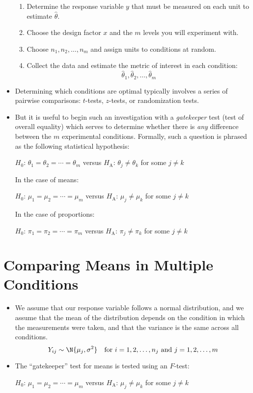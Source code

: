 \begin{itemize}
\begin{enumerate}
                  \item Determine the response variable $ y $ that must be measured on each
                        unit to estimate $ \hat{\theta} $.
                  \item Choose the design factor $ x $ and the $ m $ levels you will experiment with.
                  \item Choose $ n_1,n_2,\ldots,n_m $ and assign units to conditions at random.
                  \item Collect the data and estimate the metric of interest in each condition:
                        \[ \hat{\theta}_1,\hat{\theta}_2,\ldots,\hat{\theta}_m \]
            \end{enumerate}
      \item Determining which conditions are optimal typically involves a series of pairwise
            comparisons: $ t $-tests, $ z $-tests, or randomization tests.
      \item But it is useful to begin such an investigation with a \emph{gatekeeper}
            test (test of overall equality) which serves to determine whether
            there is \emph{any} difference between the $ m $ experimental conditions.
            Formally, such a question is phrased as the following statistical hypothesis:

            \centerline{$ H_0 $: $ \theta_1=\theta_2=\cdots=\theta_m $ versus $ H_\text{A} $: $ \theta_j\ne \theta_k $ for some $ j\ne k $}

            In the case of means:

            \centerline{$ H_0 $: $ \mu_1=\mu_2=\cdots=\mu_m $ versus $ H_\text{A} $: $ \mu_j\ne \mu_k $ for some $ j\ne k $}

            In the case of proportions:

            \centerline{$ H_0 $: $ \pi_1=\pi_2=\cdots=\pi_m $ versus $ H_\text{A} $: $ \pi_j\ne \pi_k $ for some $ j\ne k $}
\end{itemize}
\section{Comparing Means in Multiple Conditions}
\begin{itemize}
      \item We assume that our response variable follows a normal distribution,
            and we assume that the mean of the distribution depends on the condition
            in which the measurements were taken, and that the variance
            is the same across all conditions.
            \[ Y_{ij}\sim \N{\mu_j,\sigma^2}\quad\text{for }i=1,2,\ldots,n_j\text{ and }j=1,2,\ldots,m \]
      \item The ``gatekeeper'' test for means is tested using an $ F $-test:

            \centerline{$ H_0 $: $ \mu_1=\mu_2=\cdots=\mu_m $ versus $H_\text{A}$: $ \mu_j\ne \mu_k $ for some $ j\ne k $}
\end{itemize}
